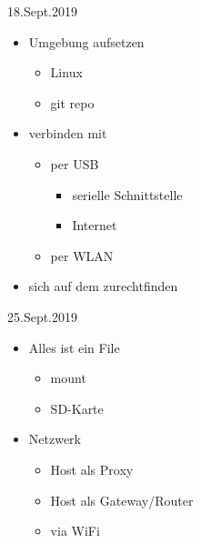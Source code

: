 \documentclass{beamer}
\begin{document}
\begin{frame}{18.Sept.2019}
\begin{itemize}
 \item Umgebung aufsetzen
 \begin{itemize}
  \item Linux
  \item git repo
 \end{itemize}
\item \target verbinden mit \host
 \begin{itemize}
  \item per USB
  \begin{itemize}
   \item serielle Schnittstelle 
   \item Internet
  \end{itemize}
  \item per WLAN
 \end{itemize}
\item sich auf dem \target zurechtfinden
\end{itemize}
\end{frame}

\begin{frame}{25.Sept.2019}
 \begin{itemize}
  \item Alles ist ein File
  \begin{itemize}
   \item {} mount
   \item {} SD-Karte
  \end{itemize}
  \item Netzwerk
  \begin{itemize}
   \item Host als Proxy
   \item Host als Gateway/Router
   \item \targetS via WiFi
  \end{itemize}
 \end{itemize}
 
\end{frame}
\end{document}
